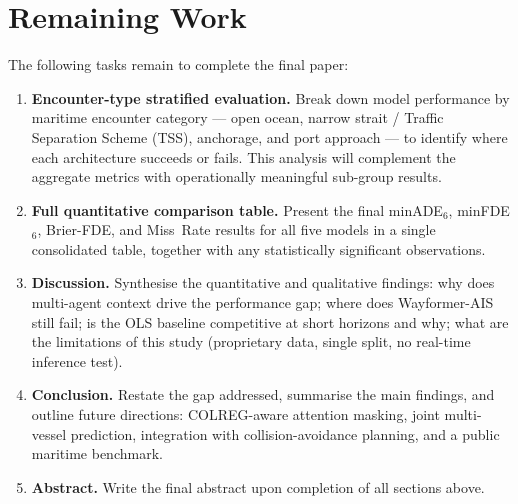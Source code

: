 \documentclass[12pt, a4paper]{article}
\begin{document}
  \section{Remaining Work}
  \label{sec:remaining_work}

  The following tasks remain to complete the final paper:

  \begin{enumerate}

    \item \textbf{Encounter-type stratified evaluation.}
    Break down model performance by maritime encounter category — open ocean,
    narrow strait / Traffic Separation Scheme (TSS), anchorage, and port approach
    — to identify where each architecture succeeds or fails.  This analysis will
    complement the aggregate metrics with operationally meaningful sub-group
    results.

    \item \textbf{Full quantitative comparison table.}
    Present the final minADE$_6$, minFDE$_6$, Brier-FDE, and Miss~Rate results
    for all five models in a single consolidated table, together with any
    statistically significant observations.

    \item \textbf{Discussion.}
    Synthesise the quantitative and qualitative findings: why does multi-agent
    context drive the performance gap; where does Wayformer-AIS still fail;
    is the OLS baseline competitive at short horizons and why; what are the
    limitations of this study (proprietary data, single split, no real-time
    inference test).

    \item \textbf{Conclusion.}
    Restate the gap addressed, summarise the main findings, and outline
    future directions: COLREG-aware attention masking, joint multi-vessel
    prediction, integration with collision-avoidance planning, and a public
    maritime benchmark.

    \item \textbf{Abstract.}
    Write the final abstract upon completion of all sections above.

  \end{enumerate}

  
  

  
\end{document}
